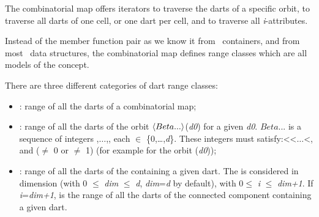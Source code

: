 The combinatorial map offers iterators to traverse the darts
of a specific orbit, to traverse all darts of one cell, or
one dart per cell, and to traverse all \emph{i}-attributes.

Instead of the  member function pair as we know it
from \stl\ containers, and from most \cgal\ data structures, the
combinatorial map defines range classes which are all models of the
 concept.

There are three different categories of dart range classes:
\begin{itemize}
\item {}: range of all the darts of a combinatorial map;
\item {}: range of all the darts of
  the orbit $\langle{}Beta...\rangle{}$(\emph{d0}) for a given \emph{d0}.  $Beta...$ is a
  sequence of integers ,$\ldots$,, each  $\in$
  \{0,\ldots,\emph{d}\}. These integers must satisfy:<<$\ldots$<,
  and ($\neq$ 0 or $\neq$ 1) (for example
   for the orbit
  \orbit{\betaun{},\betadeux{}}	(\emph{d0}));	
\item {}: range of all the darts of
  the  containing a given dart. The  is considered in
  dimension  (with 0 $\leq$ \emph{dim} $\leq$ \emph{d}, \emph{dim}=\emph{d} by default),
  with 0$\leq$ \emph{i} $\leq$ \emph{dim+1}. If \emph{i}=\emph{dim+1},
   is the range of all the darts of
  the connected component containing a given dart.
\end{itemize}


